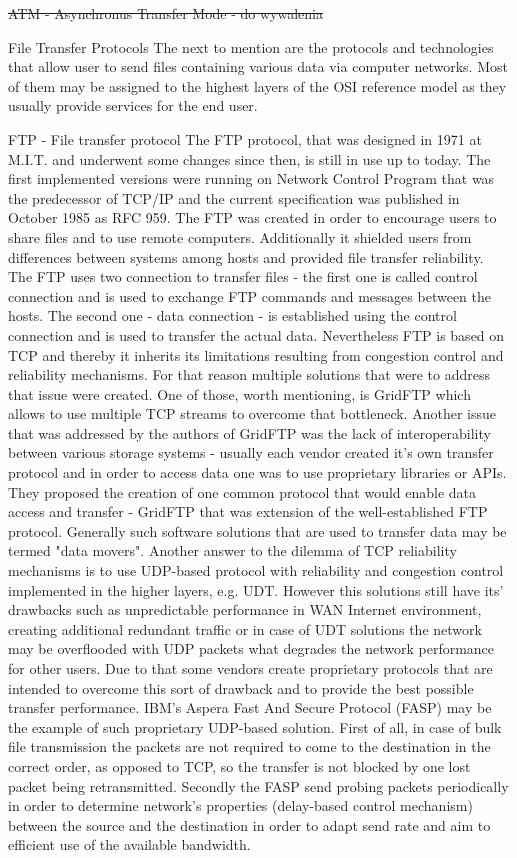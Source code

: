 \documentclass[magisterska,en]{pracamgr}
\begin{document}
\sout{ATM - Asynchronus Transfer Mode - do wywalenia}

File Transfer Protocols
The next to mention are the protocols and technologies that allow user to send files containing various data via computer networks. Most of them may be assigned to the highest layers of the OSI reference model as they usually provide services for the end user.



FTP - File transfer protocol
The FTP protocol, that was designed in 1971 at M.I.T. and underwent some changes since then, is still in use up to today. The first implemented versions were running on Network Control Program that was the predecessor of TCP/IP and the current specification was published in October 1985 as RFC 959. The FTP was created in order to encourage users to share files and to use remote computers. Additionally it shielded users from differences between systems among hosts and provided file transfer reliability. The FTP uses two connection to transfer files - the first one is called control connection and is used to exchange FTP commands and messages between the hosts. The second one - data connection - is established using the control connection and is used to transfer the actual data. \cite{RFC_FTP}
Nevertheless FTP is based on TCP and thereby it inherits its limitations resulting from congestion control and reliability mechanisms. For that reason multiple solutions that were to address that issue were created. One of those, worth mentioning, is GridFTP which allows to use multiple TCP streams to overcome that bottleneck. Another issue that was addressed by the authors of GridFTP was the lack of interoperability between various storage systems - usually each vendor created it's own transfer protocol and in order to access data one was to use proprietary libraries or APIs. They proposed the creation of one common protocol that would enable data access and transfer - GridFTP that was extension of the well-established FTP protocol.\cite{GridFTP} Generally such software solutions that are used to transfer data may be termed "data movers".
Another answer to the dilemma of TCP reliability mechanisms is to use UDP-based protocol with reliability and congestion control implemented in the higher layers, e.g. UDT.\cite{UDT} However this solutions still have its' drawbacks such as unpredictable performance in WAN Internet environment, creating additional redundant traffic or in case of UDT solutions the network may be overflooded with UDP packets what degrades the network performance for other users. Due to that some vendors create proprietary protocols that are intended to overcome this sort of drawback and to provide the best possible transfer performance. IBM's Aspera Fast And Secure Protocol (FASP) may be the example of such proprietary UDP-based solution. First of all, in case of bulk file transmission the packets are not required to come to the destination in the correct order, as opposed to TCP, so the transfer is not blocked by one lost packet being retransmitted. Secondly the FASP send probing packets periodically in order to determine network's properties (delay-based control mechanism) between the source and the destination in order to adapt send rate and aim to efficient use of the available bandwidth. \cite{IBM_Aspera}
\end{document}
